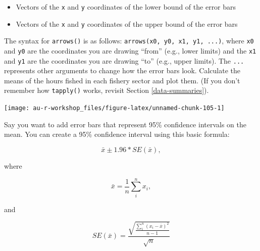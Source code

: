 \documentclass[]{book}
\newenvironment{Shaded}{\begin{snugshade}}{\end{snugshade}}
\newcommand{\KeywordTok}[1]{\textcolor[rgb]{0.13,0.29,0.53}{\textbf{#1}}}
\newcommand{\DataTypeTok}[1]{\textcolor[rgb]{0.13,0.29,0.53}{#1}}
\newcommand{\DecValTok}[1]{\textcolor[rgb]{0.00,0.00,0.81}{#1}}
\newcommand{\StringTok}[1]{\textcolor[rgb]{0.31,0.60,0.02}{#1}}
\newcommand{\OperatorTok}[1]{\textcolor[rgb]{0.81,0.36,0.00}{\textbf{#1}}}
\newcommand{\NormalTok}[1]{#1}
\providecommand{\tightlist}{%
  \setlength{\itemsep}{0pt}\setlength{\parskip}{0pt}}
\theoremstyle{definition}
\theoremstyle{definition}
\theoremstyle{definition}
\theoremstyle{remark}
\begin{document}
\begin{itemize}
\tightlist
\item
  Vectors of the \texttt{x} and \texttt{y} coordinates of the lower
  bound of the error bars
\item
  Vectors of the \texttt{x} and \texttt{y} coordinates of the upper
  bound of the error bars
\end{itemize}

The syntax for \texttt{arrows()} is as follows:
\texttt{arrows(x0,\ y0,\ x1,\ y1,\ ...)}, where \texttt{x0} and
\texttt{y0} are the coordinates you are drawing ``from'' (e.g., lower
limits) and the \texttt{x1} and \texttt{y1} are the coordinates you are
drawing ``to'' (e.g., upper limits). The \texttt{...} represents other
arguments to change how the error bars look. Calculate the means of the
hours fished in each fishery sector and plot them. (If you don't
remember how \texttt{tapply()} works, revisit Section
\ref{data-summaries}).

\begin{Shaded}
\end{Shaded}

\begin{center}\texttt{[image: au-r-workshop\_files/figure-latex/unnamed-chunk-105-1]} \end{center}

Say you want to add error bars that represent 95\% confidence intervals
on the mean. You can create a 95\% confidence interval using this basic
formula:

\begin{equation}
  \bar{x} \pm 1.96 * SE(\bar{x}),
\label{eq:ci}
\end{equation}

where

\begin{equation}
  \bar{x}=\frac{1}{n}\sum_i^n{x_i},
\label{eq:ci-mean}
\end{equation}

and

\begin{equation}
  SE(\bar{x})=\frac{\sqrt{\frac{\sum_i^n{(x_i - \bar{x})^2}}{n-1}}}{\sqrt{n}}
\label{eq:ci-se}
\end{equation}
\end{document}
